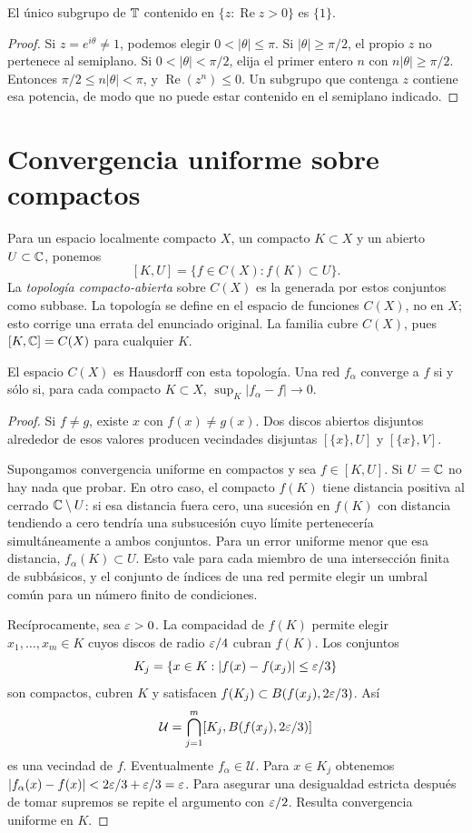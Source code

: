 \begin{lema}\label{v4:arco-sin-subgrupos}
El único subgrupo de $\mathbb T$ contenido en $\{z:\operatorname{Re}z>0\}$ es $\{1\}$.
\end{lema}
\begin{proof}
Si $z=e^{i\theta}\ne1$, podemos elegir $0<|\theta|\le\pi$. Si $|\theta|\ge\pi/2$, el propio $z$ no pertenece al semiplano. Si $0<|\theta|<\pi/2$, elija el primer entero $n$ con $n|\theta|\ge\pi/2$. Entonces $\pi/2\le n|\theta|<\pi$, y $\operatorname{Re}(z^n)\le0$. Un subgrupo que contenga $z$ contiene esa potencia, de modo que no puede estar contenido en el semiplano indicado.
\end{proof}

\section{Convergencia uniforme sobre compactos}
Para un espacio localmente compacto $X$, un compacto $K\subset X$ y un abierto $U\subset\mathbb C$, ponemos
\[
 [K,U]=\{f\in C(X):f(K)\subset U\}.
\]
La \emph{topología compacto-abierta} sobre $C(X)$ es la generada por estos conjuntos como subbase. La topología se define en el espacio de funciones $C(X)$, no en $X$; esto corrige una errata del enunciado original. La familia cubre $C(X)$, pues $[K,\mathbb C]=C(X)$ para cualquier $K$.

\begin{teorema}\label{v4:compacto-abierta}
El espacio $C(X)$ es Hausdorff con esta topología. Una red $f_\alpha$ converge a $f$ si y sólo si, para cada compacto $K\subset X$, $\sup_K|f_\alpha-f|\to0$.
\end{teorema}
\begin{proof}
Si $f\ne g$, existe $x$ con $f(x)\ne g(x)$. Dos discos abiertos disjuntos alrededor de esos valores producen vecindades disjuntas $[\{x\},U]$ y $[\{x\},V]$.

Supongamos convergencia uniforme en compactos y sea $f\in[K,U]$. Si $U=\mathbb C$ no hay nada que probar. En otro caso, el compacto $f(K)$ tiene distancia positiva al cerrado $\mathbb C\setminus U$: si esa distancia fuera cero, una sucesión en $f(K)$ con distancia tendiendo a cero tendría una subsucesión cuyo límite pertenecería simultáneamente a ambos conjuntos. Para un error uniforme menor que esa distancia, $f_\alpha(K)\subset U$. Esto vale para cada miembro de una intersección finita de subbásicos, y el conjunto de índices de una red permite elegir un umbral común para un número finito de condiciones.

Recíprocamente, sea $\varepsilon>0$. La compacidad de $f(K)$ permite elegir $x_1,\ldots,x_m\in K$ cuyos discos de radio $\varepsilon/4$ cubran $f(K)$. Los conjuntos
\[
 K_j=\{x\in K:|f(x)-f(x_j)|\le\varepsilon/3\}
\]
son compactos, cubren $K$ y satisfacen $f(K_j)\subset B(f(x_j),2\varepsilon/3)$. Así
\[
 \mathcal U=\bigcap_{j=1}^m[K_j,B(f(x_j),2\varepsilon/3)]
\]
es una vecindad de $f$. Eventualmente $f_\alpha\in\mathcal U$. Para $x\in K_j$ obtenemos
$|f_\alpha(x)-f(x)|<2\varepsilon/3+\varepsilon/3=\varepsilon$. Para asegurar una desigualdad estricta después de tomar supremos se repite el argumento con $\varepsilon/2$. Resulta convergencia uniforme en $K$.
\end{proof}

